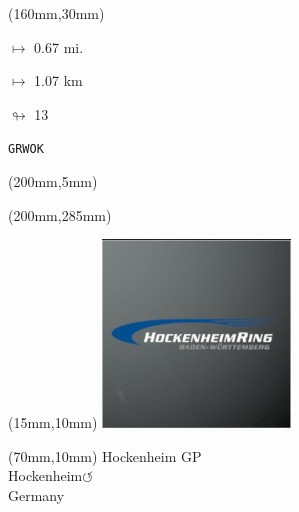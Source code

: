 \begin{textblock*}{40mm}(160mm,30mm)%
\Large
\par$\mapsto$ 0.67 mi.
\par$\mapsto$ 1.07 km
\par$\looparrowright$ 13
\par\hfill\tiny\tt GRWOK\\
\end{textblock*}
\begin{textblock*}{20mm}(200mm,5mm)%
\fbox{\thepage}
\label{GRWOK}
\end{textblock*}
\begin{textblock*}{20mm}(200mm,285mm)%
\fbox{\thepage}
\end{textblock*}

\null\newpage
\begin{textblock*}{50mm}(15mm,10mm)%
\includegraphics[width=50mm]{LG/2015-05-20_00082.png}
\end{textblock*}
\begin{textblock*}{130mm}(70mm,10mm)%
{\fontsize{20}{20}\selectfont Hockenheim GP\\}
{\fontsize{16}{16}\selectfont Hockenheim\hfill \huge$\circlearrowleft$\\}
{\fontsize{12}{12}\selectfont Germany\\}
\end{textblock*}
